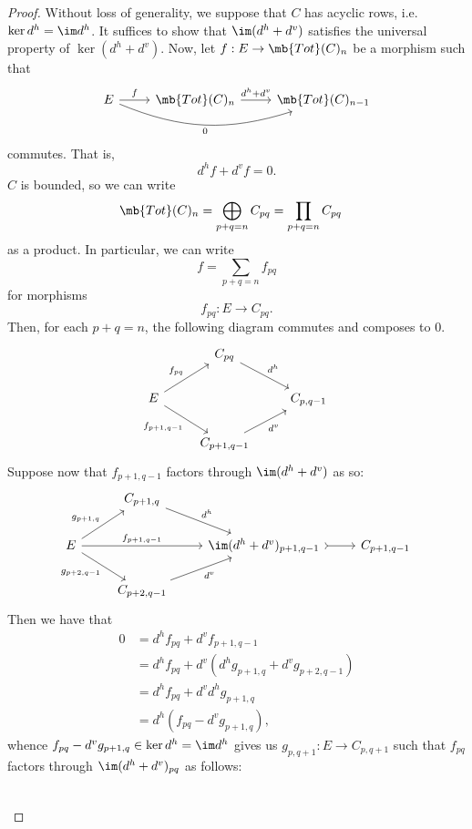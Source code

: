 \documentclass[12pt]{amsart}
\newcommand{\Tot}{\mb{Tot}}
\theoremstyle{definition}
\begin{document}
\begin{proof}
  Without loss of generality, we suppose that $C$ has acyclic rows, i.e. $\ker d^h=\im d^h$.
  It suffices to show that $\im(d^h+d^v)$ satisfies the universal property of $\ker(d^h+d^v)$.
  Now, let $f:E\to \Tot(C)_n$ be a morphism such that
  \[
    \begin{tikzcd}
      E\ar[r,"f"]\ar[rr,bend right=20,"0"']&\Tot (C)_n\ar[r,"d^h+d^v"]&\Tot(C)_{n-1}
    \end{tikzcd}
  \] 
  commutes.
  That is,
  \[
    d^hf+d^vf=0.
  \] 
  $C$ is bounded, so we can write
  \begin{align*}
    \Tot(C)_n =\bigoplus_{p+q=n}C_{pq}
              &=\prod_{p+q=n}C_{pq}
  \end{align*}
  as a product.
  In particular, we can write 
  \[
    f = \sum_{p+q=n}f_{pq}
  \] 
  for morphisms
  \[
    f_{pq}:E\to C_{pq}.
  \] 
  Then, for each $p+q=n$, the following diagram commutes and composes to 0.
  \[
    \begin{tikzcd}
      &C_{pq}\ar[dr,"d^h"]\\
      E\ar[ur,"f_{pq}"]\ar[dr,"f_{p+1,q-1}"']&&C_{p,q-1}\\%
      &C_{p+1,q-1}\ar[ur,"d^v"']
    \end{tikzcd}
  \] 
  Suppose now that $f_{p+1,q-1}$ factors through $\im(d^h+d^v)$ as so:
  \[
    \begin{tikzcd}
      &C_{p+1,q}\ar[dr,"d^h"]\\
      E\ar[rr,"f_{p+1,q-1}"]\ar[ur,"g_{p+1,q}"]\ar[dr,"g_{p+2,q-1}"']&&\im(d^h+d^v)_{p+1,q-1}\ar[r,tail]&C_{p+1,q-1}\\
      &C_{p+2,q-1}\ar[ur,"d^v"']
    \end{tikzcd}
  \] 
  Then we have that
  \begin{align*}
    0 &= d^hf_{pq}+d^v f_{p+1,q-1} \\
      &= d^hf_{pq}+d^v(d^hg_{p+1,q} + d^vg_{p+2,q-1}) \\
      &= d^hf_{pq}+d^vd^hg_{p+1,q} \\
      &= d^h(f_{pq}-d^vg_{p+1,q}),
  \end{align*}
  whence $f_{pq}-d^vg_{p+1,q}\in \ker d^h = \im d^h$ gives us $g_{p,q+1}:E\to C_{p,q+1}$ such that $f_{pq}$ factors through $\im(d^h+d^v)_{pq}$ as follows:%
  \[
    \begin{tikzcd}

\end{tikzcd}\]
\end{proof}
\end{document}
